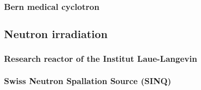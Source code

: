 \subsubsection{Bern medical cyclotron}

\subsection{Neutron irradiation}

\subsubsection{Research reactor of the Institut Laue-Langevin}

\subsubsection{Swiss Neutron Spallation Source (SINQ)}
